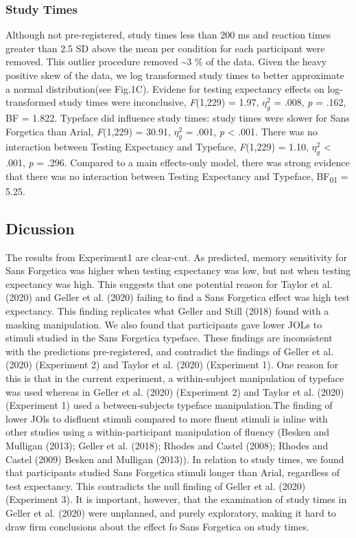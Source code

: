 \documentclass[
  english,
  jou]{apa6}
\begin{document}
\hypertarget{study-times}{%
\subsubsection{Study Times}\label{study-times}}

Although not pre-registered, study times less than 200 ms and reaction times greater than 2.5 SD above the mean per condition for each participant were removed. This outlier procedure removed \textasciitilde3 \% of the data. Given the heavy positive skew of the data, we log transformed study times to better approximate a normal distribution(see Fig.1C). Evidene for testing expectancy effects on log-transformed study times were inconclusive, \emph{F}(1,229) = 1.97, \(\eta_{g}^{2}\) = .008, \emph{p} = .162, BF = 1.822. Typeface did influence study times: study times were slower for Sans Forgetica than Arial, \emph{F}(1,229) = 30.91, \(\eta_{g}^{2}\) = .001, \emph{p} \textless{} .001. There was no interaction between Testing Expectancy and Typeface, \emph{F}(1,229) = 1.10, \(\eta_{g}^{2}\) \textless{} .001, \emph{p} = .296. Compared to a main effects-only model, there was strong evidence that there was no interaction between Testing Expectancy and Typeface, BF\textsubscript{01} = 5.25.

\hypertarget{dicussion}{%
\subsection{Dicussion}\label{dicussion}}

The results from Experiment1 are clear-cut. As predicted, memory sensitivity for Sans Forgetica was higher when testing expectancy was low, but not when testing expectancy was high. This suggests that one potential reason for Taylor et al. (2020) and Geller et al. (2020) failing to find a Sans Forgetica effect was high test expectancy. This finding replicates what Geller and Still (2018) found with a masking manipulation. We also found that participants gave lower JOLs to stimuli studied in the Sans Forgetica typeface. These findings are inconsistent with the predictions pre-registered, and contradict the findings of Geller et al. (2020) (Experiment 2) and Taylor et al. (2020) (Experiment 1). One reason for this is that in the current experiment, a within-subject manipulation of typeface was used whereas in Geller et al. (2020) (Experiment 2) and Taylor et al. (2020) (Experiment 1) used a between-subjects typeface manipulation.The finding of lower JOls to disfluent stimuli compared to more fluent stimuli is inline with other studies using a within-participant manipulation of fluency (Besken and Mulligan (2013); Geller et al. (2018); Rhodes and Castel (2008); Rhodes and Castel (2009) Besken and Mulligan (2013)). In relation to study times, we found that participants studied Sans Forgetica stimuli longer than Arial, regardless of test expectancy. This contradicts the null finding of Geller et al. (2020) (Experiment 3). It is important, however, that the examination of study times in Geller et al. (2020) were unplanned, and purely exploratory, making it hard to draw firm conclusions about the effect fo Sans Forgetica on study times.
\end{document}
